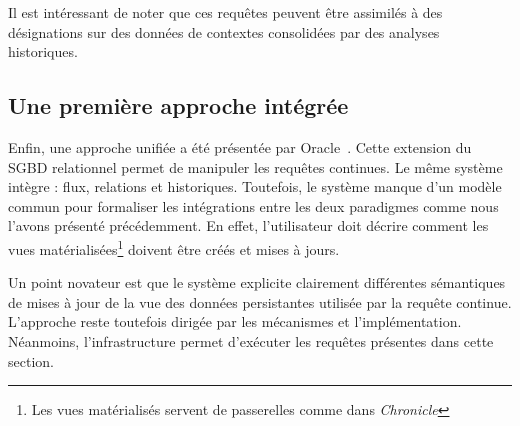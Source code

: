 Il est intéressant de noter que ces requêtes peuvent être assimilés à des désignations sur des données de contextes consolidées par des analyses historiques.

\subsection{Une première approche intégrée}
Enfin, une approche unifiée a été présentée par Oracle~\cite{Witkowski:oraclecq}. Cette extension du SGBD relationnel permet de manipuler les requêtes continues. Le même système intègre : flux, relations et historiques. Toutefois, le système manque d'un modèle commun pour formaliser les intégrations entre les deux paradigmes comme nous l'avons présenté précédemment. En effet, l'utilisateur doit décrire comment les vues matérialisées\footnote{Les vues matérialisés servent de passerelles comme dans \textit{Chronicle}} doivent être créés et mises à jours. 

Un point novateur est que le système explicite clairement différentes sémantiques de mises à jour de la vue des données persistantes utilisée par la requête continue. L'approche reste toutefois dirigée par les mécanismes et l'implémentation. Néanmoins, l'infrastructure permet d'exécuter les requêtes présentes dans cette section.
